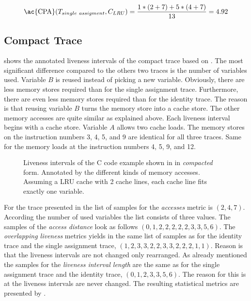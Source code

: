 \documentclass[onecolumn, openright, master, english, signatures]{dbrgrptt}
\begin{document}
\begin{equation}\label{equ:trace-transformation-sa-marked}
\text{\ac{CPA}}(T_{single~assigment}, C_{LRU}) = \frac{1 * (2 + 7) + 5 * (4 + 7)}{13} = 4.92
\end{equation}

\subsection{Compact Trace}
 shows the annotated liveness intervals of the compact trace based on .
The most significant difference compared to the others two traces is the number of variables used.
Variable $B$ is reused instead of picking a new variable.
Obviously, there are less memory stores required than for the single assignment trace.
Furthermore, there are even less memory stores required than for the identity \ac{trace}.
The reason is that reusing variable $B$ turns the memory store into a cache store.
The other memory accesses are quite similar as explained above.
Each liveness interval begins with a cache store.
Variable $A$ allows two cache loads.
The memory stores on the instruction numbers 3, 4, 5, and 9 are identical for all three traces.
Same for the memory loads at the instruction numbers 4, 5, 9, and 12.

\begin{figure}
  \centering
  
  \caption{Liveness intervals of the C code example shown in  in \emph{compacted} form. Annotated by the different kinds of memory accesses. Assuming a \ac{LRU} cache with 2 cache lines, each cache line fits exactly one variable.}
  \label{fig:trace-transformation-compact-marked}
\end{figure}

For the \ac{trace} presented in  the list of samples for the \emph{accesses} metric is $(2, 4, 7)$.
According the number of used variables the list consists of three values.
The samples of the \emph{access distance} look as follows $(0, 1, 2, 2, 2, 2, 2, 3, 3, 5, 6)$.
The \emph{overlapping liveness} metrics yields in the same list of samples as for the identity \ac{trace} and the single assignment \ac{trace}, $(1, 2, 3, 3, 2, 2, 3, 3, 2, 2, 2, 1, 1)$.
Reason is that the liveness intervals are not changed only rearranged.
As already mentioned the samples for the \emph{liveness interval length} are the same as for the single assignment \ac{trace} and the identity \ac{trace}, $(0, 1, 2, 3, 3, 5, 6)$.
The reason for this is at the liveness intervals are never changed.
The resulting statistical metrics are presented by .
\end{document}

